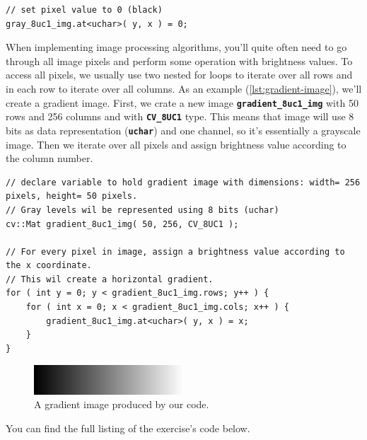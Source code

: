 \documentclass[10pt]{article}
\newcommand{\code}[1]{\textbf{\texttt{#1}}}
\newcommand{\tuchar}[0]{\code{uchar}}
\begin{document}
\begin{lstlisting}[style=CStyle,caption={Assigning a new value to a pixel.},label={lst:pixel-assign}]
// set pixel value to 0 (black)
gray_8uc1_img.at<uchar>( y, x ) = 0;
\end{lstlisting}

When implementing image processing algorithms, you'll quite often need to go through all image pixels
and perform some operation with brightness values. To access all pixels, we usually use two nested for loops
to iterate over all rows and in each row to iterate over all columns. As an example (\ref{lst:gradient-image}),
we'll create a gradient image.
First, we crate a new image \code{gradient\_8uc1\_img} with 50 rows and 256 columns and with \code{CV\_8UC1} type.
This means that image will use 8 bits as data representation (\tuchar{}) and one channel, so it's essentially
a grayscale image. Then we iterate over all pixels and assign brightness value according to the column number.

\begin{lstlisting}[style=CStyle,caption={Create an image of a horizontal gradient from the black color to the white using grayscale.},label={lst:gradient-image}]
// declare variable to hold gradient image with dimensions: width= 256 pixels, height= 50 pixels.
// Gray levels wil be represented using 8 bits (uchar)
cv::Mat gradient_8uc1_img( 50, 256, CV_8UC1 );

// For every pixel in image, assign a brightness value according to the x coordinate.
// This wil create a horizontal gradient.
for ( int y = 0; y < gradient_8uc1_img.rows; y++ ) {
    for ( int x = 0; x < gradient_8uc1_img.cols; x++ ) {
        gradient_8uc1_img.at<uchar>( y, x ) = x;
    }
}
\end{lstlisting}

\begin{figure}[th]
\begin{center}
    \includegraphics[width=0.5\textwidth]{gradient_8uc1_img}
    \caption{A gradient image produced by our code.}
    \label{img:gradient_example}
\end{center}
\end{figure}

You can find the full listing of the exercise's code below.
\end{document}
